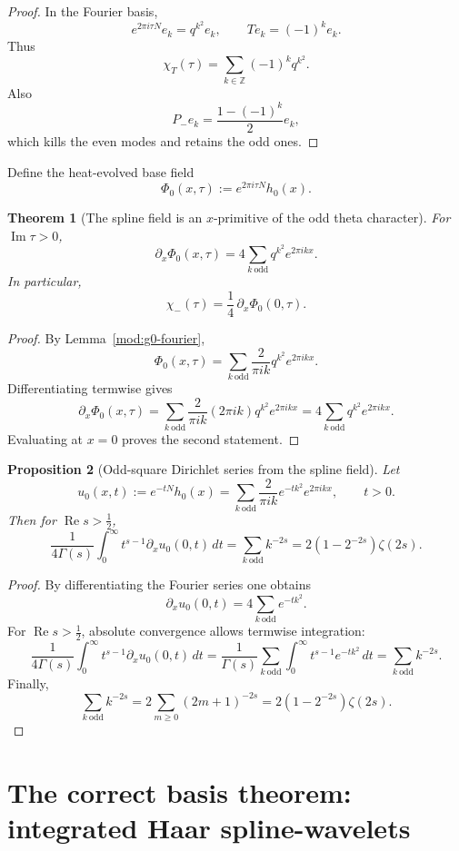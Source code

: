 \documentclass[11pt,a4paper]{article}
\numberwithin{equation}{section}
\newtheorem{theorem}{Theorem}[section]
\newtheorem{proposition}[theorem]{Proposition}
\theoremstyle{definition}
\theoremstyle{remark}
\DeclareMathOperator{\Rea}{Re}
\DeclareMathOperator{\Ima}{Im}
\newcommand{\ZZ}{\mathbb Z}
\begin{document}
\begin{proof}
In the Fourier basis,
\[
e^{2\pi i\tau N}e_k=q^{k^2}e_k,
\qquad
Te_k=(-1)^ke_k.
\]
Thus
\[
\chi_T(\tau)=\sum_{k\in\ZZ}(-1)^k q^{k^2}.
\]
Also
\[
P_-e_k=\frac{1-(-1)^k}{2}e_k,
\]
which kills the even modes and retains the odd ones.
\end{proof}

Define the heat-evolved base field
\[
\Phi_0(x,\tau):=e^{2\pi i\tau N}h_0(x).
\]

\begin{theorem}[The spline field is an $x$-primitive of the odd theta character]\label{mod:spline-primitive}
For $\Ima\tau>0$,
\[
\partial_x\Phi_0(x,\tau)
=
4\sum_{k\ \mathrm{odd}}q^{k^2}e^{2\pi ikx}.
\]
In particular,
\[
\chi_-(\tau)=\frac14\,\partial_x\Phi_0(0,\tau).
\]
\end{theorem}

\begin{proof}
By Lemma~\ref{mod:g0-fourier},
\[
\Phi_0(x,\tau)=\sum_{k\ \mathrm{odd}}\frac{2}{\pi ik}q^{k^2}e^{2\pi ikx}.
\]
Differentiating termwise gives
\[
\partial_x\Phi_0(x,\tau)
=
\sum_{k\ \mathrm{odd}}\frac{2}{\pi ik}(2\pi ik)q^{k^2}e^{2\pi ikx}
=
4\sum_{k\ \mathrm{odd}}q^{k^2}e^{2\pi ikx}.
\]
Evaluating at $x=0$ proves the second statement.
\end{proof}

\begin{proposition}[Odd-square Dirichlet series from the spline field]\label{mod:odd-square}
Let
\[
u_0(x,t):=e^{-tN}h_0(x)
=
\sum_{k\ \mathrm{odd}}\frac{2}{\pi ik}e^{-tk^2}e^{2\pi ikx},
\qquad t>0.
\]
Then for $\Rea s>\frac12$,
\[
\frac{1}{4\Gamma(s)}
\int_0^\infty t^{s-1}\partial_xu_0(0,t)\,dt
=
\sum_{k\ \mathrm{odd}}k^{-2s}
=
2(1-2^{-2s})\zeta(2s).
\]
\end{proposition}

\begin{proof}
By differentiating the Fourier series one obtains
\[
\partial_xu_0(0,t)=4\sum_{k\ \mathrm{odd}}e^{-tk^2}.
\]
For $\Rea s>\frac12$, absolute convergence allows termwise integration:
\[
\frac{1}{4\Gamma(s)}
\int_0^\infty t^{s-1}\partial_xu_0(0,t)\,dt
=
\frac{1}{\Gamma(s)}\sum_{k\ \mathrm{odd}}\int_0^\infty t^{s-1}e^{-tk^2}\,dt
=
\sum_{k\ \mathrm{odd}}k^{-2s}.
\]
Finally,
\[
\sum_{k\ \mathrm{odd}}k^{-2s}=2\sum_{m\ge 0}(2m+1)^{-2s}=2(1-2^{-2s})\zeta(2s).
\]
\end{proof}

\section{The correct basis theorem: integrated Haar spline-wavelets}
\end{document}

